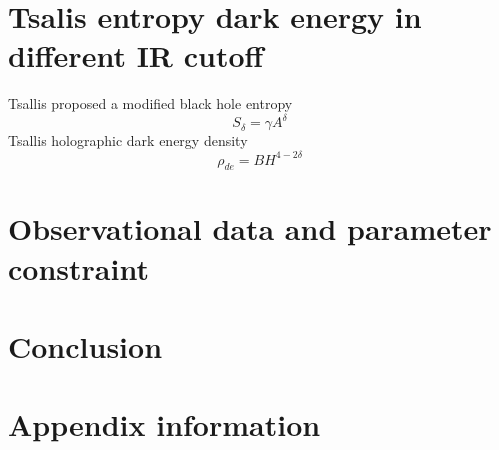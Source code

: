\documentclass[linenumbers]{aastex631}
\begin{document}
\section{Tsalis entropy dark energy in different IR cutoff}
Tsallis proposed a modified black hole entropy
\begin{equation}
    S_{\delta}=\gamma A^{\delta}
\end{equation}
Tsallis holographic dark energy density
\begin{equation}
    \rho_{de}=BH^{4-2\delta}
\end{equation}

\section{Observational data and parameter constraint }

\section{Conclusion}
\appendix

\section{Appendix information}



{}

\end{document}

